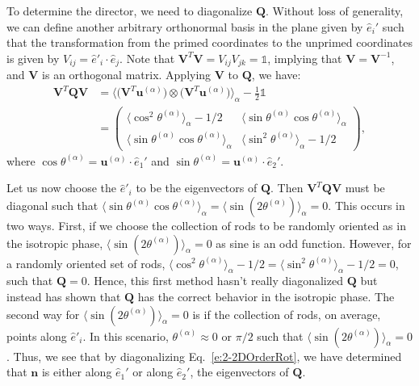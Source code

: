 To determine the director, we need to diagonalize $\mathbf{Q}$.
Without loss of generality, we can define another arbitrary orthonormal basis in the plane given by $\hat{e}_i'$ such that the transformation from the primed coordinates to the unprimed coordinates is given by $V_{ij} = \hat{e}'_i \cdot \hat{e}_j$.
Note that $\mathbf{V}^T \mathbf{V} = V_{ij}V_{jk} =  \mathbb{1}$, implying that $\mathbf{V} = \mathbf{V}^{-1}$, and $\mathbf{V}$ is an orthogonal matrix.
Applying $\mathbf{V}$ to $\mathbf{Q}$, we have:
\begin{align}
  \mathbf{V}^T \mathbf{Q} \mathbf{V} &=
  \bigg \langle \big ( \mathbf{V}^T \mathbf{u}^{(\alpha)} \big ) \otimes \big ( \mathbf{V}^T \mathbf{u}^{(\alpha)} \big )\bigg \rangle_{\alpha}  - \frac{1}{2} \mathbb{1} \nonumber \\ & =
  \begin{pmatrix}
    \langle \cos^2 \theta^{(\alpha)}\rangle_{\alpha} - 1/2 & \langle \sin \theta^{(\alpha)} \cos \theta^{(\alpha)} \rangle_{\alpha} \\
    \langle \sin \theta^{(\alpha)} \cos \theta^{(\alpha)} \rangle_{\alpha} & \langle \sin^2 \theta^{(\alpha)} \rangle_{\alpha} - 1/2
  \end{pmatrix},\label{e:2-2DOrderRot}
\end{align}
where $\cos \theta^{(\alpha)} = \mathbf{u}^{(\alpha)} \cdot \hat{e}_1'$ and $\sin \theta^{(\alpha)} = \mathbf{u}^{(\alpha)} \cdot \hat{e}_2'$.

Let us now choose the $\hat{e}'_i$ to be the eigenvectors of $\mathbf{Q}$.
Then $ \mathbf{V}^T \mathbf{Q} \mathbf{V}$ must be diagonal such that $\langle \sin \theta^{(\alpha)} \cos \theta^{(\alpha)} \rangle_{\alpha} = \langle \sin (2 \theta^{(\alpha)}) \rangle_{\alpha} = 0$.
This occurs in two ways.
First, if we choose the collection of rods to be randomly oriented as in the isotropic phase, $\langle \sin (2 \theta^{(\alpha)}) \rangle_{\alpha} = 0$ as sine is an odd function.
However, for a randomly oriented set of rods, $\langle \cos^2 \theta^{(\alpha)}\rangle_{\alpha} - 1/2 = \langle \sin^2 \theta^{(\alpha)}\rangle_{\alpha} - 1/2 = 0$, such that $\mathbf{Q} = 0$.
Hence, this first method hasn't really diagonalized $\mathbf{Q}$ but instead has shown that $\mathbf{Q}$ has the correct behavior in the isotropic phase.
The second way for $\langle \sin (2 \theta^{(\alpha)}) \rangle_{\alpha} = 0$ is if the collection of rods, on average, points along $\hat{e}'_i$.
In this scenario, $\theta^{(\alpha)} \approx 0 \textrm{ or } \pi/2$ such that $\langle \sin (2 \theta^{(\alpha)}) \rangle_{\alpha} = 0$.
Thus, we see that by diagonalizing Eq.~\ref{e:2-2DOrderRot}, we have determined that $\mathbf{n}$ is either along $\hat{e}_1'$ or along $\hat{e}_2'$, the eigenvectors of $\mathbf{Q}$.


